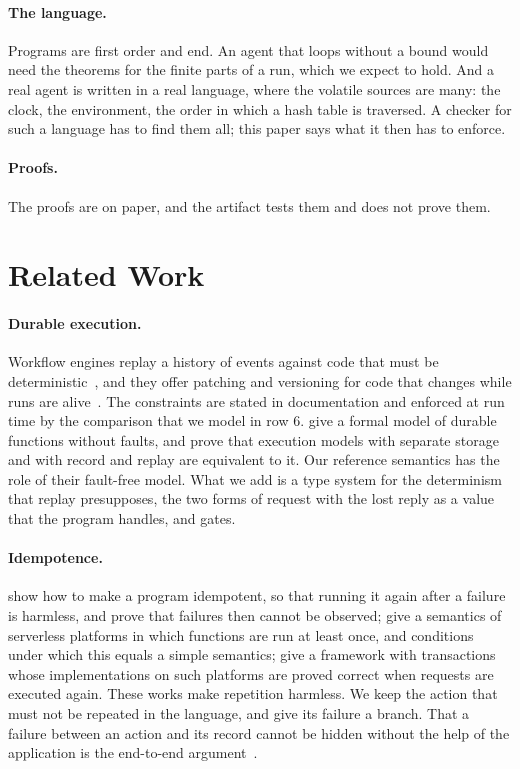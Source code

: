 \documentclass[acmsmall,nonacm,screen]{acmart}
\begin{document}
\paragraph{The language.} Programs are first order and end. An agent that loops without a
bound would need the theorems for the finite parts of a run, which we expect to hold. And a
real agent is written in a real language, where the volatile sources are many: the clock, the
environment, the order in which a hash table is traversed. A checker for such a language has
to find them all; this paper says what it then has to enforce.

\paragraph{Proofs.} The proofs are on paper, and the artifact tests them and does not prove
them.

\section{Related Work}
\label{sec:related}

\paragraph{Durable execution.} Workflow engines replay a history of events against code that
must be deterministic~\citep{temporal-workflow,azure-constraints}, and they offer patching
and versioning for code that changes while runs are
alive~\citep{temporal-patching,azure-versioning}. The constraints are stated in
documentation and enforced at run time by the comparison that we model in row 6.
\citet{burckhardt2021} give a formal model of durable functions without faults, and prove
that execution models with separate storage and with record and replay are equivalent to it.
Our reference semantics has the role of their fault-free model. What we add is a type system for the determinism that
replay presupposes, the two forms of request with the lost reply as a value that the program
handles, and gates.

\paragraph{Idempotence.} \citet{ramalingam2013} show how to make a program idempotent, so
that running it again after a failure is harmless, and prove that failures then cannot be
observed; \citet{jangda2019} give a semantics of serverless platforms in which functions are
run at least once, and conditions under which this equals a simple semantics;
\citet{kallas2023} give a framework with transactions whose implementations on such
platforms are proved correct when requests are executed again. These works make repetition
harmless. We keep the action that must not be repeated in the language, and give
its failure a branch. That a failure between an action and its record cannot be hidden without
the help of the application is the end-to-end argument~\citep{saltzer1984}.
\end{document}
